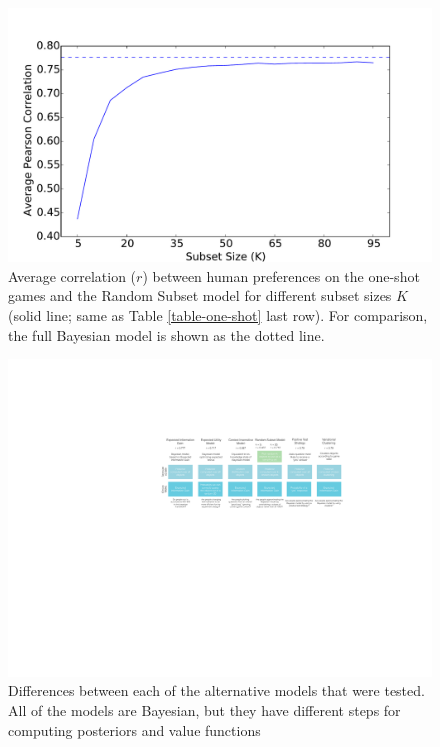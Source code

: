 \documentclass[11pt,letterpaper]{article}
\begin{document}

\begin{figure}[h!]
\begin{center}
\includegraphics[width=0.85\linewidth]{correlation_for_subset_size}
\end{center}
\caption{Average correlation ($r$) between human preferences on the one-shot games and the Random Subset model for different subset sizes $K$ (solid line; same as Table \ref{table-one-shot} last row). For comparison, the full Bayesian model is shown as the dotted line.}
\label{rs-model-fit}
\end{figure}


\begin{figure}[h!]
\begin{center}
\includegraphics[width=1.0\linewidth]{alternative_models2}
\end{center}
\caption{Differences between each of the alternative models that were tested. All of the models are Bayesian, but they have different steps for computing posteriors and value functions} 
\label{alternative_models_fig}
\end{figure}
\end{document}
